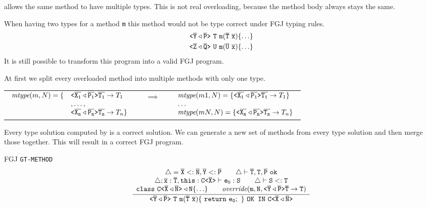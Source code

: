 \documentclass[a4paper,USenglish,cleveref, autoref, thm-restate]{lipics-v2021}
\begin{document}
\TFGJ allows the same method to have multiple types.
This is not real overloading, because the method body always stays the same.

When having two types for a method \texttt{m} this method would not be type correct under FGJ typing rules.
\begin{align*}
  \mathtt{
  \exptype{}{\ol{Y} \triangleleft \ol{P}} \ T\ \texttt{m}(\ol{T}\ \ol{x})\set{\ldots} } \\
  \mathtt{
    \exptype{}{\ol{Z} \triangleleft \ol{Q}} \ U\ \texttt{m}(\ol{U}\ \ol{x})\set{\ldots}
  }
\end{align*}
It is still possible to transform this program into a valid FGJ program.

At first we split every overloaded method into multiple methods with only one type.

\begin{small}
\begin{tabularx}{\textwidth}{cXcXc}
  $\begin{array}{rl}
    \textit{mtype}(m, N) = \{  & \mathtt{ \texttt{<} \overline{\tt X_1}\triangleleft \overline{\tt P_1} \texttt{>} } \overline{\tt T_1} \to T_1  \\
    & , \ldots , \\
    & \mathtt{ \texttt{<} \overline{\tt X_n}\triangleleft \overline{\tt P_n} \texttt{>} } \overline{\tt T_n} \to T_n \}
  \end{array}
  $ & & $\implies$ & & $\begin{array}{l}
    \textit{mtype}(m1, N) = \{   \mathtt{ \texttt{<} \overline{\tt X_1}\triangleleft \overline{\tt P_1} \texttt{>} } \overline{\tt T_1} \to T_1 \}\\
    \ldots \\
    \textit{mtype}(mN, N) = \{   \mathtt{ \texttt{<} \overline{\tt X_n}\triangleleft \overline{\tt P_n} \texttt{>} } \overline{\tt T_n} \to T_n \}\\
  \end{array}$
\end{tabularx}
\end{small}

Every type solution computed by \unify is a correct solution.
We can generate a new set of methods from every type solution and then merge those together.
This will result in a correct FGJ program.

FGJ \texttt{GT-METHOD}
\begin{align*}
\ddfrac{
  \begin{array}{c}
    \mathtt{\triangle = \ol{X} <: \ol{N}, \ol{Y} <: \ol{P} \quad \quad \triangle \vdash \ol{T}, T, \ol{P}\ \texttt{ok}}\\
    \mathtt{\triangle; \ol{x}:\ol{T}, \texttt{this}: \exptype{C}{\ol{X}} \vdash e_0 : S \quad \quad \triangle \vdash S <: T} \\
    \mathtt{\texttt{class}\ \exptype{C}{\ol{X} \triangleleft \ol{N}} \triangleleft N \set{\ldots} \quad \quad \textit{override}(m, N, \exptype{}{\ol{Y} \triangleleft \ol{P}} \ol{T} \to T)}
  \end{array}
}{
  \mathtt{\exptype{}{\ol{Y} \triangleleft \ol{P}}\ T\ \texttt{m}(\ol{T}\ \ol{x})\set{\ \texttt{return}\ e_0;\ } \ \texttt{OK IN}\ \exptype{C}{\ol{X} \triangleleft \ol{N}}}
}
\end{align*}
\end{document}
